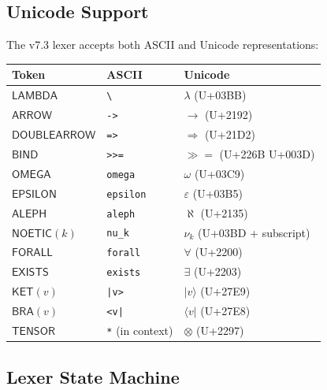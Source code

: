 \subsection{Unicode Support}
\label{subsec:unicode-support}

\begin{definition}
\label{def:unicode-mapping}
The v7.3 lexer accepts both ASCII and Unicode representations:

\begin{center}
\begin{tabular}{lll}
\toprule
\textbf{Token} & \textbf{ASCII} & \textbf{Unicode} \\
\midrule
$\mathsf{LAMBDA}$ & \texttt{\textbackslash} & $\lambda$ (U+03BB) \\
$\mathsf{ARROW}$ & \texttt{->} & $\to$ (U+2192) \\
$\mathsf{DOUBLEARROW}$ & \texttt{=>} & $\Rightarrow$ (U+21D2) \\
$\mathsf{BIND}$ & \texttt{>>=} & $\gg\!=$ (U+226B U+003D) \\
$\mathsf{OMEGA}$ & \texttt{omega} & $\omega$ (U+03C9) \\
$\mathsf{EPSILON}$ & \texttt{epsilon} & $\varepsilon$ (U+03B5) \\
$\mathsf{ALEPH}$ & \texttt{aleph} & $\aleph$ (U+2135) \\
$\mathsf{NOETIC}(k)$ & \texttt{nu\_k} & $\nu_k$ (U+03BD + subscript) \\
$\mathsf{FORALL}$ & \texttt{forall} & $\forall$ (U+2200) \\
$\mathsf{EXISTS}$ & \texttt{exists} & $\exists$ (U+2203) \\
$\mathsf{KET}(v)$ & \texttt{|v>} & $|v\rangle$ (U+27E9) \\
$\mathsf{BRA}(v)$ & \texttt{<v|}  & $\langle v|$ (U+27E8) \\
$\mathsf{TENSOR}$ & \texttt{*} (in context) & $\otimes$ (U+2297) \\
\bottomrule
\end{tabular}
\end{center}
\end{definition}

\subsection{Lexer State Machine}
\label{subsec:lexer-state-machine}


